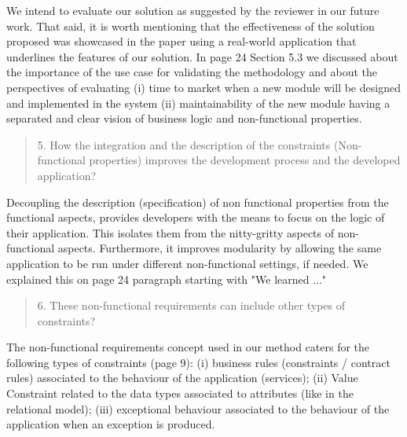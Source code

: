 \documentclass[12pt,a4wide]{article}
\begin{document}
\noindent 
We intend to evaluate our solution as suggested by the reviewer in our future work. That said, it is worth mentioning that the effectiveness of the solution proposed was showcased in the paper using a real-world application that underlines the features of our solution. In page 24 Section 5.3  we discussed about the importance of the use case for validating the methodology and about the perspectives of evaluating (i) time to market when a new module will be designed and implemented in the system (ii) maintainability of the new module having a separated and clear vision of business logic and non-functional properties.

\begin{quotation}\sf\footnotesize

5.    How the integration and the description of the constraints (Non-functional properties) improves the development process and the developed application? 
\end{quotation}

\noindent 
Decoupling the description (specification) of non functional properties from the functional aspects, provides developers with the means to focus on the logic of their application. This isolates them from the nitty-gritty aspects of non-functional aspects. Furthermore, it improves modularity by allowing the same application to be run under different non-functional settings, if needed. We explained this on page 24 paragraph starting with "We learned ..."


\begin{quotation}\sf\footnotesize

6.    These non-functional requirements can include other types of constraints? 
\end{quotation}

\noindent 
The non-functional requirements concept used in our method caters for the following types of constraints (page 9): (i) business rules (constraints / contract rules) associated to the behaviour of the application (services); (ii) Value Constraint related to the data types associated to attributes (like in the relational model); (iii) exceptional behaviour associated to the behaviour of the application when an exception is produced. 

\end{document}
